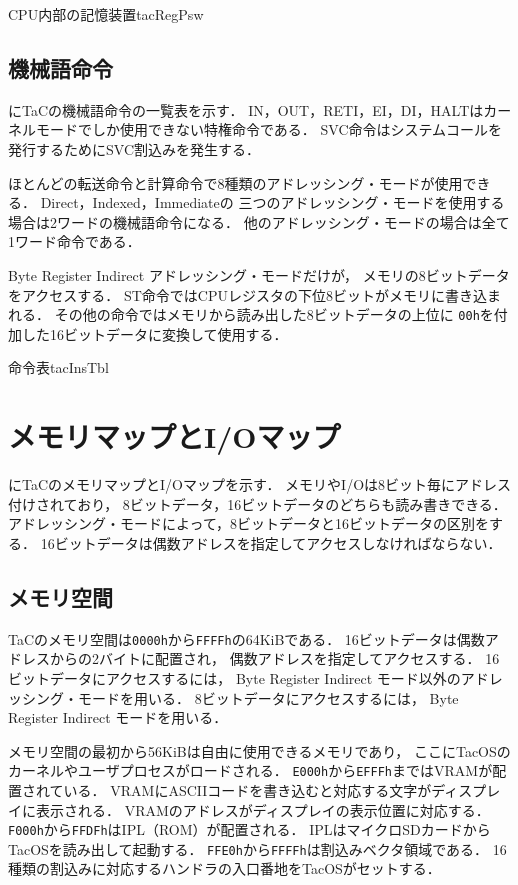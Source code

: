 {CPU内部の記憶装置}{tacRegPsw}

\subsection{機械語命令}
にTaCの機械語命令の一覧表を示す．
IN，OUT，RETI，EI，DI，HALTはカーネルモードでしか使用できない特権命令である．
SVC命令はシステムコールを発行するためにSVC割込みを発生する．

ほとんどの転送命令と計算命令で8種類のアドレッシング・モードが使用できる．
Direct，Indexed，Immediateの
三つのアドレッシング・モードを使用する場合は2ワードの機械語命令になる．
他のアドレッシング・モードの場合は全て1ワード命令である．

Byte Register Indirect アドレッシング・モードだけが，
メモリの8ビットデータをアクセスする．
ST命令ではCPUレジスタの下位8ビットがメモリに書き込まれる．
その他の命令ではメモリから読み出した8ビットデータの上位に
{\tt 00h}を付加した16ビットデータに変換して使用する．

{命令表}{tacInsTbl}

\newpage
\section{メモリマップとI/Oマップ}
にTaCのメモリマップとI/Oマップを示す．
メモリやI/Oは8ビット毎にアドレス付けされており，
8ビットデータ，16ビットデータのどちらも読み書きできる．
アドレッシング・モードによって，8ビットデータと16ビットデータの区別をする．
16ビットデータは偶数アドレスを指定してアクセスしなければならない．

\subsection{メモリ空間}
TaCのメモリ空間は{\tt 0000h}から{\tt FFFFh}の64KiBである．
16ビットデータは偶数アドレスからの2バイトに配置され，
偶数アドレスを指定してアクセスする．
16ビットデータにアクセスするには，
Byte Register Indirect モード以外のアドレッシング・モードを用いる．
8ビットデータにアクセスするには，
Byte Register Indirect モードを用いる．

メモリ空間の最初から56KiBは自由に使用できるメモリであり，
ここにTacOSのカーネルやユーザプロセスがロードされる．
{\tt E000h}から{\tt EFFFh}まではVRAMが配置されている．
VRAMにASCIIコードを書き込むと対応する文字がディスプレイに表示される．
VRAMのアドレスがディスプレイの表示位置に対応する．
{\tt F000h}から{\tt FFDFh}はIPL（ROM）が配置される．
IPLはマイクロSDカードからTacOSを読み出して起動する．
{\tt FFE0h}から{\tt FFFFh}は割込みベクタ領域である．
16種類の割込みに対応するハンドラの入口番地をTacOSがセットする．

